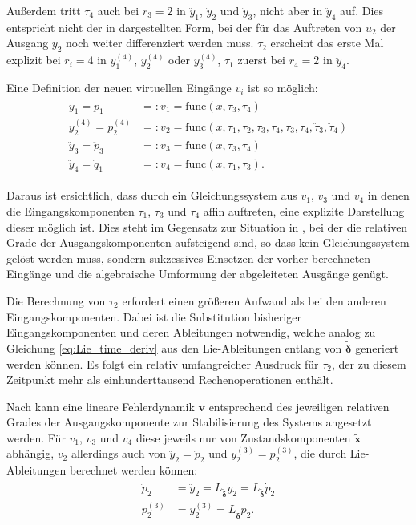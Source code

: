 Außerdem tritt $\tau_4$ auch bei $r_3 = 2$ in $\ddot{y}_1$, $\ddot{y}_2$ und $\ddot{y}_3$, nicht aber in $\ddot{y}_4$ auf. Dies entspricht nicht der in \cite[S. 206]{NLRT_Roebenack} dargestellten Form, bei der für das Auftreten von $u_2$ der Ausgang $y_2$ noch weiter differenziert werden muss. $\tau_2$ erscheint das erste Mal explizit bei $r_i = 4$ in $y_1^{(4)}$, $y_2^{(4)}$ oder $y_3^{(4)}$, $\tau_1$ zuerst bei $r_4 = 2$ in $\ddot{y}_4$.

Eine Definition der neuen virtuellen Eingänge $v_i$ ist so möglich:
\begin{align}
\begin{split}
	\ddot{y}_1 = \ddot{p}_1 &=: v_1 = \mathrm{func}(x, \tau_3, \tau_4) \\
	y_2^{(4)} = p_2^{(4)} &=: v_2 = \mathrm{func}(x, \tau_1, \tau_2, \tau_3, \tau_4, \dot{\tau}_3, \dot{\tau}_4, \ddot{\tau}_3, \ddot{\tau}_4) \\
	\ddot{y}_3 = \ddot{p}_3 &=: v_3 = \mathrm{func}(x, \tau_3, \tau_4) \\
	\ddot{y}_4 = \ddot{q}_1 &=: v_4 = \mathrm{func}(x, \tau_1, \tau_3) .
\end{split}
\end{align}

Daraus ist ersichtlich, dass durch ein Gleichungssystem aus $v_1$, $v_3$ und $v_4$ in denen die Eingangskomponenten $\tau_1$, $\tau_3$ und $\tau_4$ affin auftreten, eine explizite Darstellung dieser möglich ist. Dies steht im Gegensatz zur Situation in \cite[S. 207]{NLRT_Roebenack}, bei der die relativen Grade der Ausgangskomponenten aufsteigend sind, so dass kein Gleichungssystem gelöst werden muss, sondern sukzessives Einsetzen der vorher berechneten Eingänge und die algebraische Umformung der abgeleiteten Ausgänge genügt.
 
Die Berechnung von $\tau_2$ erfordert einen größeren Aufwand als bei den anderen Eingangskomponenten. Dabei ist die Substitution bisheriger Eingangskomponenten und deren Ableitungen notwendig, welche analog zu Gleichung \eqref{eq:Lie_time_deriv} aus den Lie-Ableitungen entlang von $\tilde{\boldsymbol{\delta}}$ generiert werden können. Es folgt ein relativ umfangreicher Ausdruck für $\tau_2$, der zu diesem Zeitpunkt mehr als einhunderttausend Rechenoperationen enthält.

Nach \cite[S. 208]{NLRT_Roebenack} kann eine lineare Fehlerdynamik $\mathbf{v}$ entsprechend des jeweiligen relativen Grades der Ausgangskomponente zur Stabilisierung des Systems angesetzt werden. Für $v_1$, $v_3$ und $v_4$ diese jeweils nur von Zustandskomponenten $\tilde{\mathbf{x}}$ abhängig, $v_2$ allerdings auch von $\ddot{y}_2 = \ddot{p}_2$ und $y_2^{(3)} = p_2^{(3)}$, die durch Lie-Ableitungen berechnet werden können:
\begin{align}
	\label{eq:p2_derivs_Lie}
	\begin{split}
		\ddot{p}_2 &= \ddot{y}_2 = L_{\tilde{\boldsymbol{\delta}}} \dot{y}_2 = L_{\tilde{\boldsymbol{\delta}}} \dot{p}_2 \\
		p_2^{(3)} &= y_2^{(3)} = L_{\tilde{\boldsymbol{\delta}}} \ddot{p}_2.
	\end{split}
\end{align}

